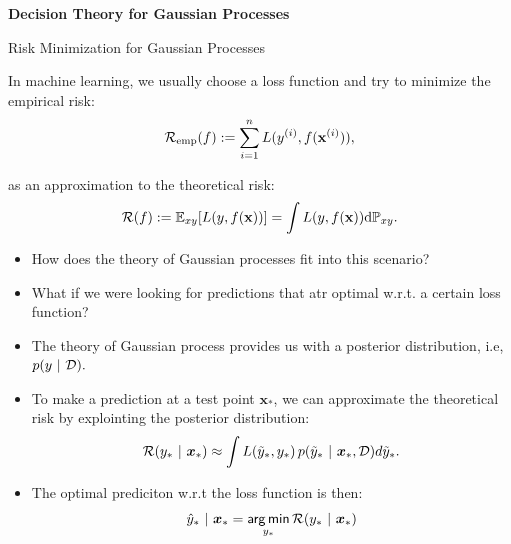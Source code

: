 \begin{frame}[c]{}
\centering
\huge
\textbf{Decision Theory for Gaussian Processes}
\end{frame}
\begin{frame}[c,allowframebreaks]{Risk Minimization for Gaussian Processes}

In machine learning, we usually choose a loss function and try to minimize the empirical risk:
$$\mathcal{R}_{\text{emp}}(f) := \sum_{i=1}^{n}L(y^{(i)},f(\mathbf{x}^{(i)})),$$

as an approximation to the theoretical risk:
$$\mathcal{R}(f):= \mathbb{E}_{xy}[L(y,f(\mathbf{x}))]= \int L(y,f(\mathbf{x})) \mathrm{d} \mathbb{P}_{x y}.$$

\lz

\begin{itemize}
  \item How does the theory of Gaussian processes fit into this scenario? 
  \lz
  \item What if we were looking for predictions that atr optimal w.r.t. a certain loss function?
\end{itemize}



\framebreak


\begin{itemize}

\item The theory of Gaussian process provides us with a posterior distribution, i.e, $p(y ~|~\mathcal{D}).$

\lz
  
\item To make a prediction at a test point $\bm{x}_*$, we can approximate the theoretical risk by explointing the posterior distribution:
$$\mathcal{R}(y_* ~|~ \bm{x}_*) \approx \int L(\tilde y_*, y_*) \, p(\tilde y_*~|~\bm{x}_*, \mathcal{D})d\tilde y_*.$$
 
\lz

\item The optimal prediciton w.r.t the loss function is then: 
$$\hat y_* ~|~ \bm{x}_* = \mathop{\sf arg\,min}_{y_*} \mathcal{R}(y_*~|~ \bm{x}_*)$$

\end{itemize}


\end{frame}


